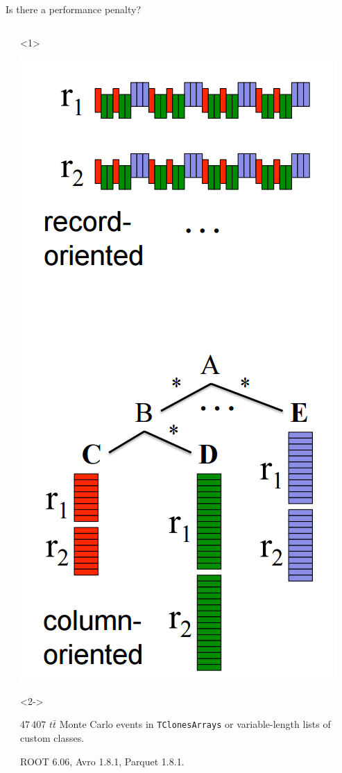 \documentclass{beamer}
\begin{document}
\begin{frame}{Is there a performance penalty?}
\begin{columns}
\begin{column}{0.55\linewidth}
\begin{itemize}
\end{itemize}
\end{column}
\begin{column}{0.5\linewidth}
\begin{onlyenv}<1>
\begin{center}
\includegraphics[width=0.5\linewidth]{columnar.png}
\end{center}
\end{onlyenv}
\begin{onlyenv}<2->
\begin{center}
\begin{minipage}{0.9\linewidth}
\scriptsize 47\,407 $t\bar{t}$ Monte Carlo events in {\tt TClonesArrays} or variable-length lists of custom classes.

\vspace{0.1 cm}
ROOT 6.06, Avro 1.8.1, Parquet 1.8.1.
\end{minipage}


\end{center}
\end{onlyenv}
\end{column}
\end{columns}
\end{frame}
\end{document}
